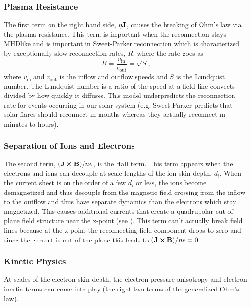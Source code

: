 \subsubsection{Plasma Resistance}

The first term on the right hand side, $\eta \vb{J}$, causes the breaking of Ohm's law via the plasma resistance. This term is important when the reconnection stays MHDlike and is important in Sweet-Parker reconnection which is characterized by exceptionally slow reconnection rates, $R$, where the rate goes as
\begin{equation}
  R = \frac{v_\text{in}}{v_\text{out}} = \sqrt{S},
\end{equation}
where $v_\text{in}$ and $v_\text{out}$ is the inflow and outflow speeds and $S$ is the Lundquist number. The Lundquist number is a ratio of the speed at a field line convects divided by how quickly it diffuses. This model underpredicts the reconnection rate for events occurring in our solar system (e.g. Sweet-Parker predicts that solar flares should reconnect in months whereas they actually reconnect in minutes to hours).

\subsubsection{Separation of Ions and Electrons}
\label{ss2:hall_reconnection}

The second term, $(\vb{J} \cross \vb{B}) / ne$, is the Hall term. This term appears when the electrons and ions can decouple at scale lengths of the ion skin depth, $d_i$. When the current sheet is on the order of a few $d_i$ or less, the ions become demagnetized and thus decouple from the magnetic field crossing from the inflow to the outflow and thus have separate dynamics than the electrons which stay magnetized. This causes additional currents that create a quadrupolar out of plane field structure near the x-point (see \cite{Zweibel_Yamada_2009}). This term can't actually break field lines because at the x-point the reconnecting field component drops to zero and since the current is out of the plane this leads to $(\vb{J} \cross \vb{B}) / ne = 0$.

\subsubsection{Kinetic Physics}

At scales of the electron skin depth, the electron pressure anisotropy and electron inertia terms can come into play (the right two terms of the generalized Ohm's law). %

